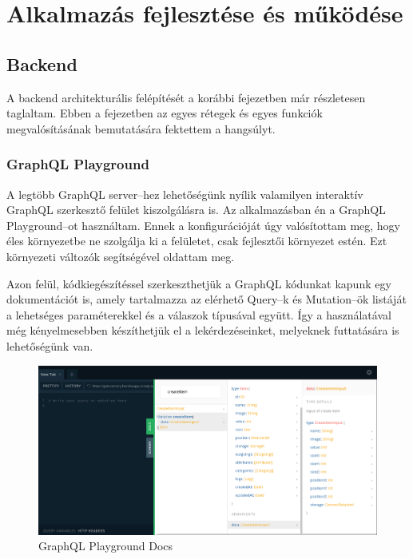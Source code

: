 \chapter{Alkalmazás fejlesztése és működése}

\section{Backend}
A backend architekturális felépítését a korábbi fejezetben már részletesen taglaltam.  
Ebben a fejezetben az egyes rétegek és egyes funkciók megvalósításának bemutatására fektettem a hangsúlyt.

\subsection{GraphQL Playground}
A legtöbb GraphQL server–hez lehetőségünk nyílik valamilyen interaktív GraphQL szerkesztő felület kiszolgálásra is.
Az alkalmazásban én a GraphQL Playground–ot használtam. Ennek a konfigurációját úgy valósítottam meg, hogy éles környezetbe ne szolgálja ki a felületet, csak fejlesztői környezet estén.
Ezt környezeti változók segítségével oldattam meg.

Azon felül, kódkiegészítéssel szerkeszthetjük a GraphQL kódunkat kapunk egy dokumentációt is, amely tartalmazza az elérhető Query–k és Mutation–ök listáját a lehetséges paraméterekkel és a válaszok típusával együtt.
Így a használatával még kényelmesebben készíthetjük el a lekérdezéseinket, melyeknek futtatására is lehetőségünk van.

\begin{figure}[!ht]
  \centering
  \includegraphics[width=150mm, keepaspectratio]{figures/playground_docs.png}
  \caption{GraphQL Playground Docs}
  \label{fig:playgroundDocs}
\end{figure}

